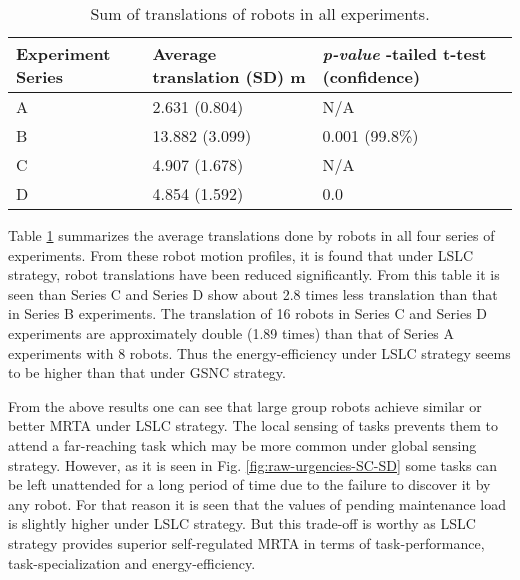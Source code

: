 \begin{table}[H]
\begin{center}
\caption{Sum of translations of robots in all experiments.}
\begin{tabular}{|p{0.8in}|m{1in}|m{0.9in}|}
\hline Experiment \protect\newline Series & Average \protect\newline translation \protect\newline(SD) m & \textit{p-value} \protect\newline 1-tailed t-test (confidence)\\ 
\hline A & 2.631 (0.804) & N/A\\ 
\hline B & 13.882 (3.099) & 0.001 (99.8\%)\\
\hline C & 4.907 (1.678) & N/A\\
\hline D  & 4.854  (1.592) & 0.0\\
\hline
\end{tabular}
\label{table:motion-cmp} 
\end{center}
\end{table}
Table \ref{table:motion-cmp} summarizes the average translations done by robots in all four series of experiments. From these robot motion profiles, it is found that under LSLC strategy, robot translations have been reduced significantly. From this table it is seen than Series C and Series D show about 2.8 times less translation than that in Series B experiments. The translation of 16 robots in Series C and Series D experiments are approximately double (1.89 times) than that of Series A experiments with 8 robots.  Thus the energy-efficiency under LSLC strategy seems to be higher  than that under GSNC strategy.

From the above results one can see that large group robots achieve similar or better MRTA under LSLC strategy. The local sensing of tasks prevents them to attend a far-reaching task which may be more common under global sensing strategy. However, as it is seen in Fig. \ref{fig:raw-urgencies-SC-SD}
some tasks can be left unattended for a long period of time due to the failure to discover it by any robot. For that reason it is seen that the values of pending maintenance load is slightly higher under LSLC strategy. But this trade-off is worthy as LSLC strategy provides superior self-regulated MRTA in terms of task-performance, task-specialization and energy-efficiency.
